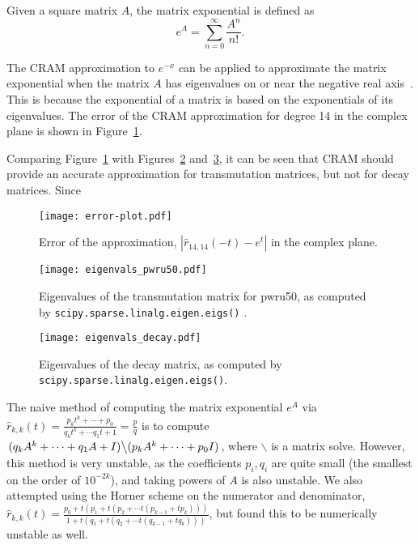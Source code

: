 Given a square matrix $A$, the matrix exponential is defined
as~\cite{ationneeded}
\begin{equation}
  \label{eq:matrix-exponential}
  e^{A} = \sum_{n=0}^\infty \frac{A^n}{n!}.
\end{equation}

The CRAM approximation to $e^{-x}$ can be applied to approximate the matrix
exponential when the matrix $A$ has eigenvalues on or near the negative real
axis~\cite{pusa2010computing}. This is because the exponential of a matrix is based on the exponentials of
its eigenvalues. The error of the CRAM approximation for degree 14 in the
complex plane is shown in Figure~\ref{fig:error-plot}.

Comparing Figure~\ref{fig:error-plot} with Figures~\ref{fig:eigenvals-pwru50}
and~\ref{fig:eigenvals-decay}, it can be seen that CRAM should provide an
accurate approximation for transmutation matrices, but not for decay matrices.
Since


\begin{figure}[!ht]
\centering
\texttt{[image: error-plot.pdf]}
\caption{Error of the approximation, $\left |\hat{r}_{14,14}(-t) - e^{t}\right
  |$ in the complex plane. }
\label{fig:error-plot}
\end{figure}

\begin{figure}[!ht]
\centering
\texttt{[image: eigenvals\_pwru50.pdf]}
\caption{Eigenvalues of the transmutation matrix for pwru50, as computed by
  \texttt{scipy.\allowbreak{}sparse.\allowbreak{}linalg.\allowbreak{}eigen.\allowbreak{}eigs()}
  .}
\label{fig:eigenvals-pwru50}
\end{figure}

\begin{figure}[!ht]
\centering
\texttt{[image: eigenvals\_decay.pdf]}
\caption{Eigenvalues of the decay matrix, as computed by
  \texttt{scipy.\allowbreak{}sparse.\allowbreak{}linalg.\allowbreak{}eigen.\allowbreak{}eigs()}.}
\label{fig:eigenvals-decay}
\end{figure}


The naive method of computing the matrix exponential $e^A$ via
$\hat{r}_{k, k}(t)=\frac{p_kt^k + \cdots + p_0}{q_kt^k + \cdots q_1t +
  1}=\frac{p}{q}$ is to compute
$\left .(q_kA^k + \cdots + q_1A + I)\middle\backslash(p_kA^k + \cdots + p_0 I)\right.$, where
$\backslash$ is a matrix solve. However, this method is very unstable, as the
coefficients $p_i,q_i$ are quite small (the smallest on the order of
$10^{-2k}$), and taking powers of $A$ is also unstable. We also attempted
using the Horner scheme on the numerator and denominator,
$\hat{r}_{k, k}(t)=\frac{p_0 + t(p_1 + t(p_2 + \cdots t(p_{k-1} + tp_k)))}{1 +
  t(q_1 + t(q_2 + \cdots t(q_{k-1} + tq_k)))}$, but found this to be
numerically unstable as well.

